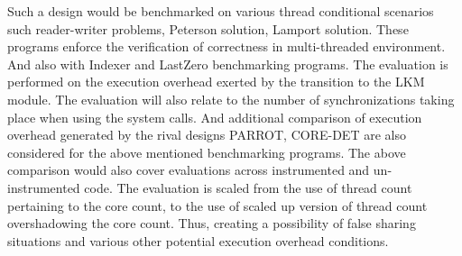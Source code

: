 \documentclass[12pt]{article}
\begin{document}
Such a design would be benchmarked on various thread conditional scenarios such reader-writer problems, Peterson solution, Lamport solution. 
These programs enforce the verification of correctness in multi-threaded environment. 
And also with Indexer and LastZero benchmarking programs. 
The evaluation is performed on the execution overhead exerted by the transition to the LKM module. 
The evaluation will also relate to the number of synchronizations taking place when using the system calls. 
And additional comparison of execution overhead generated by the rival designs PARROT, CORE-DET are also considered for the above mentioned benchmarking programs. 
The above comparison would also cover evaluations across instrumented and un-instrumented code. 
The evaluation is scaled from the use of thread count pertaining to the core count, to the use of scaled up version of thread count overshadowing the core count. 
Thus, creating a possibility of false sharing situations and various other potential execution overhead conditions. 
\end{document}

